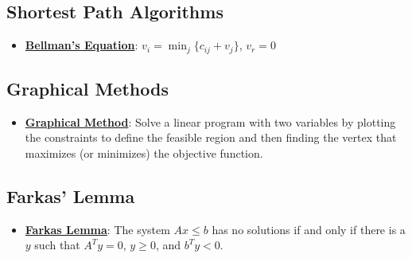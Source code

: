 \documentclass{article}%
\begin{document}
%
\subsection{Shortest Path Algorithms}%
\label{subsec:ShortestPathAlgorithms}%
\begin{itemize}[leftmargin=*]%
\item \href{https://www.math.purdue.edu/~yipn/421/2024-11-14-NetAppls.pdf#page=17}{\textbf{Bellman's Equation}}: $v_i = \min_{j} \{c_{ij} + v_j\}$, $v_r = 0$%
\end{itemize}

%
\subsection{Graphical Methods}%
\label{subsec:GraphicalMethods}%
\begin{itemize}[leftmargin=*]%
\item \href{https://www.math.purdue.edu/~yipn/421/2024-12-03-Duality.pdf#page=3}{\textbf{Graphical Method}}: Solve a linear program with two variables by plotting the constraints to define the feasible region and then finding the vertex that maximizes (or minimizes) the objective function.%
\end{itemize}

%
\subsection{Farkas' Lemma}%
\label{subsec:FarkasLemma}%
\begin{itemize}[leftmargin=*]%
\item \href{https://www.math.purdue.edu/~yipn/421/2024-10-28-Farkas.pdf#page=1}{\textbf{Farkas Lemma}}: The system $Ax \le b$ has no solutions if and only if there is a $y$ such that $A^T y = 0$, $y \ge 0$, and $b^T y < 0$.%
\end{itemize}

%
\end{document}
